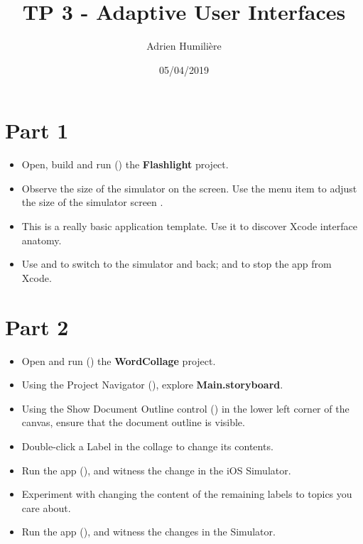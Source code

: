 \documentclass[a4paper,11pt]{scrartcl}
\begin{document}
\newcommand{\mytitle}{TP 3 - Adaptive User Interfaces}
\title{\mytitle}
\author{Adrien Humilière}
\date{05/04/2019}

\maketitle

\section*{Part 1}

\begin{itemize}
\item Open, build and run () the \textbf{Flashlight} project.
\item Observe the size of the simulator on the screen. Use the menu item  to adjust the size of the simulator screen       .
\item This is a really basic application template. Use it to discover Xcode interface anatomy.
\item Use \keys{\cmd+\tab} and  to switch to the simulator and back; and to stop the app from Xcode.
\end{itemize}

\section*{Part 2}

\begin{itemize}
\item Open and run () the \textbf{WordCollage} project.
\item Using the Project Navigator (), explore \textbf{Main.storyboard}.
\item Using the Show Document Outline control () in the lower left corner of the canvas, ensure that the document outline is visible.
\item Double-click a Label in the collage to change its contents.
\item Run the app (), and witness the change in the iOS Simulator.
\item Experiment with changing the content of the remaining labels to topics you care about.
\item Run the app (), and witness the changes in the Simulator.
\end{itemize}
\end{document}
